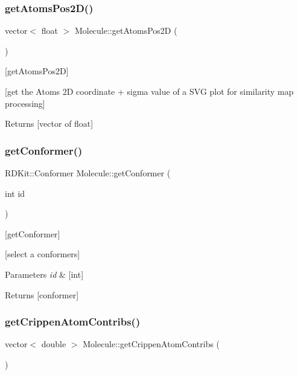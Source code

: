 \subsubsection{\texorpdfstring{get\+Atoms\+Pos2\+D()}{getAtomsPos2D()}}
{\footnotesize\ttfamily vector$<$ float $>$ Molecule\+::get\+Atoms\+Pos2D (\begin{DoxyParamCaption}{ }\end{DoxyParamCaption})}



\mbox{[}get\+Atoms\+Pos2D\mbox{]} 

\mbox{[}get the Atoms 2D coordinate + sigma value of a S\+VG plot for similarity map processing\mbox{]} \begin{DoxyReturn}{Returns}
\mbox{[}vector of float\mbox{]} 
\end{DoxyReturn}
\mbox{\label{class_molecule_ad58d85938153a73ee5f17426474e6a90}} 
\subsubsection{\texorpdfstring{get\+Conformer()}{getConformer()}}
{\footnotesize\ttfamily R\+D\+Kit\+::\+Conformer Molecule\+::get\+Conformer (\begin{DoxyParamCaption}\item[{int}]{id }\end{DoxyParamCaption})}



\mbox{[}get\+Conformer\mbox{]} 

\mbox{[}select a conformers\mbox{]}


\begin{DoxyParams}{Parameters}
{\em id} & \mbox{[}int\mbox{]} \\
\hline
\end{DoxyParams}
\begin{DoxyReturn}{Returns}
\mbox{[}conformer\mbox{]} 
\end{DoxyReturn}
\mbox{\label{class_molecule_a89046a3437790e24581fd2958d49c544}} 
\subsubsection{\texorpdfstring{get\+Crippen\+Atom\+Contribs()}{getCrippenAtomContribs()}}
{\footnotesize\ttfamily vector$<$ double $>$ Molecule\+::get\+Crippen\+Atom\+Contribs (\begin{DoxyParamCaption}{ }\end{DoxyParamCaption})}



